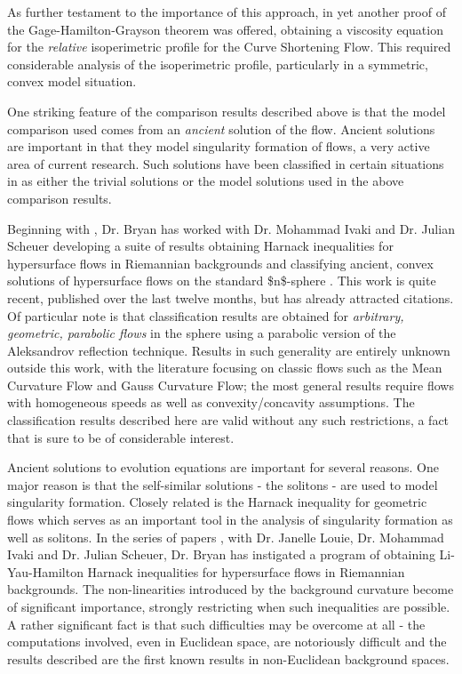 \documentclass[12pt]{article}
\begin{document}
As further testament to the importance of this approach, in \cite{MR2843240} yet another proof of the Gage-Hamilton-Grayson theorem was offered, obtaining a viscosity equation for the \emph{relative} isoperimetric profile for the Curve Shortening Flow. This required considerable analysis of the isoperimetric profile, particularly in a symmetric, convex model situation.

One striking feature of the comparison results described above is that the model comparison used comes from an \emph{ancient} solution of the flow. Ancient solutions are important in that they model singularity formation of flows, a very active area of current research. Such solutions have been classified in certain situations in as either the trivial solutions or the model solutions used in the above comparison results.

Beginning with \cite{bryanlouie}, Dr. Bryan has worked with Dr. Mohammad Ivaki and Dr. Julian Scheuer developing a suite of results obtaining Harnack inequalities for hypersurface flows in Riemannian backgrounds and classifying ancient, convex solutions of hypersurface flows on the standard \$n\$-sphere \cite{BIS4,2016arXiv160401694B,2016arXiv160401694B,2015arXiv150802821B}. This work is quite recent, published over the last twelve months, but has already attracted citations. Of particular note is that classification results are obtained for \emph{arbitrary, geometric, parabolic flows} in the sphere using a parabolic version of the Aleksandrov reflection technique. Results in such generality are entirely unknown outside this work, with the literature focusing on classic flows such as the Mean Curvature Flow and Gauss Curvature Flow; the most general results require flows with homogeneous speeds as well as convexity/concavity assumptions. The classification results described here are valid without any such restrictions, a fact that is sure to be of considerable interest.

Ancient solutions to evolution equations are important for several reasons. One major reason is that the self-similar solutions - the solitons - are used to model singularity formation. Closely related is the Harnack inequality for geometric flows which serves as an important tool in the analysis of singularity formation as well as solitons. In the series of papers \cite{bryanlouie,2016arXiv160401694B,2015arXiv150802821B,2015arXiv151203374B}, with Dr. Janelle Louie, Dr. Mohammad Ivaki and Dr. Julian Scheuer, Dr. Bryan has instigated a program of obtaining Li-Yau-Hamilton Harnack inequalities for hypersurface flows in Riemannian backgrounds. The non-linearities introduced by the background curvature become of significant importance, strongly restricting when such inequalities are possible. A rather significant fact is that such difficulties may be overcome at all - the computations involved, even in Euclidean space, are notoriously difficult and the results described are the first known results in non-Euclidean background spaces.
\end{document}
